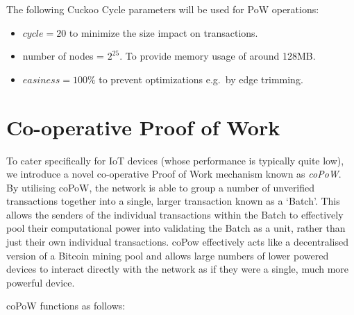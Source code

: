 \documentclass[a4paper,10pt,twocolumn]{article}
\begin{document}
The following Cuckoo Cycle parameters will be used for PoW operations:

\begin{itemize}
	\item \(cycle = 20\) to minimize the size impact on transactions.
    \item number of nodes = \( 2^{25} \). To provide memory usage of around 128MB\@.
    \item \(easiness = 100\% \) to prevent optimizations e.g.\ by edge trimming.
\end{itemize}

\section{Co-operative Proof of Work}
\label{sec:coPoW}

To cater specifically for IoT devices (whose performance is typically quite low), we introduce a novel co-operative Proof of Work 
mechanism known as \emph{coPoW}. By utilising coPoW, the network is able to group a number of unverified transactions together into a 
single, larger transaction known as a `Batch'. This allows the senders of the individual transactions within the Batch to effectively 
pool their computational power into validating the Batch as a unit, rather than just their own individual transactions.
coPow effectively acts like a decentralised version of a Bitcoin mining pool and allows large numbers of lower powered devices to interact directly with the network as if they were a single, much more powerful device.

coPoW functions as follows:
\end{document}
